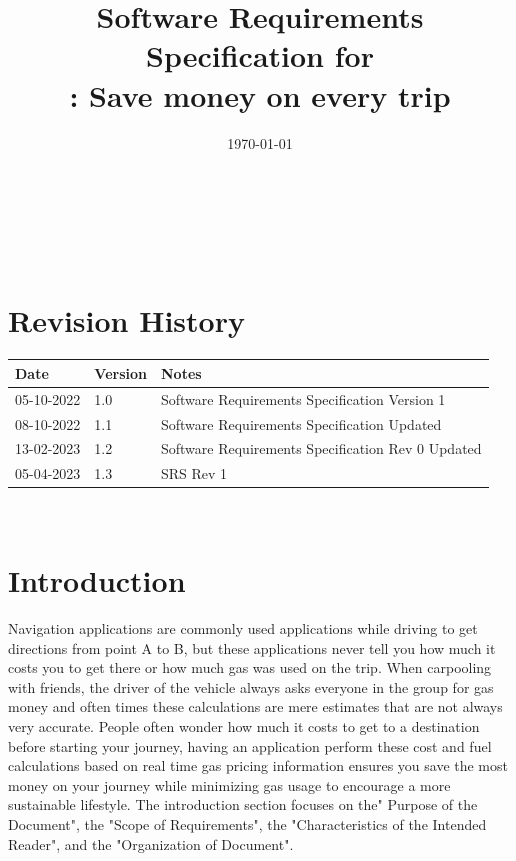 \documentclass[12pt]{article}
\begin{document}
\title{Software Requirements Specification for \\ \progname: Save money on every trip} 
\author{\authname}
\date{\today}
	
\maketitle

~\newpage


\tableofcontents

~\newpage

\section*{Revision History}

\begin{tabularx}{\textwidth}{p{3cm}p{2cm}X}
\toprule {\bf Date} & {\bf Version} & {\bf Notes}\\
\midrule
05-10-2022 & 1.0 & Software Requirements Specification Version 1\\
08-10-2022 & 1.1 & Software Requirements Specification Updated\\
13-02-2023 & 1.2 & Software Requirements Specification Rev 0 Updated\\
05-04-2023 & 1.3 & SRS Rev 1\\
\bottomrule
\end{tabularx}

~\newpage


\section{Introduction}

Navigation applications are commonly used applications while driving to get
directions from point A to B, but these applications never tell you how much it
costs you to get there or how much gas was used on the trip. When carpooling
with friends, the driver of the vehicle always asks everyone in the group for gas
money and often times these calculations are mere estimates that are not always
very accurate. People often wonder how much it costs to get to a destination
before starting your journey, having an application perform these cost and fuel
calculations based on real time gas pricing information ensures you save the
most money on your journey while minimizing gas usage to encourage a more
sustainable lifestyle. The introduction section focuses on the" Purpose of the Document", 
the "Scope of Requirements", the "Characteristics of the Intended Reader", 
and the "Organization of Document". 
\end{document}
